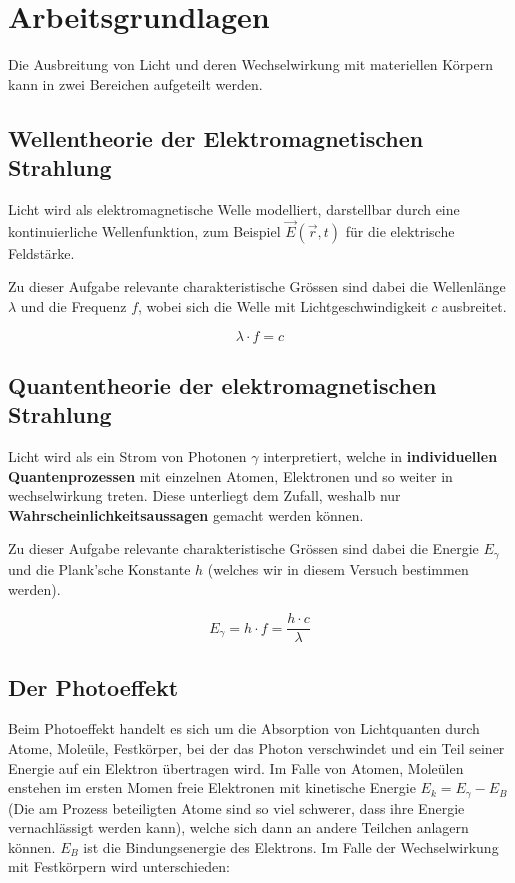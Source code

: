 \section{Arbeitsgrundlagen}

Die Ausbreitung von Licht und deren Wechselwirkung mit  materiellen  K\"orpern
kann in zwei Bereichen aufgeteilt werden.


\subsection{Wellentheorie der Elektromagnetischen Strahlung}

Licht wird als elektromagnetische  Welle  modelliert,  darstellbar  durch eine
kontinuierliche Wellenfunktion,  zum  Beispiel  $\vec{E}(\vec{r},t)$ f\"ur die
elektrische Feldst\"arke.

Zu  dieser  Aufgabe  relevante  charakteristische  Gr\"ossen  sind  dabei  die
Wellenl\"ange  $\lambda$  und  die  Frequenz  $f$, wobei sich  die  Welle  mit
Lichtgeschwindigkeit $c$ ausbreitet.

\begin{equation}
    \lambda \cdot f = c
\end{equation}


\subsection{Quantentheorie der elektromagnetischen Strahlung}

Licht  wird  als  ein  Strom  von  Photonen $\gamma$ interpretiert, welche  in
\textbf{individuellen Quantenprozessen} mit  einzelnen  Atomen, Elektronen und
so weiter  in  wechselwirkung treten. Diese unterliegt dem Zufall, weshalb nur
\textbf{Wahrscheinlichkeitsaussagen} gemacht werden k\"onnen.

Zu dieser Aufgabe relevante charakteristische Gr\"ossen sind dabei die Energie
$E_{\gamma}$ und die Plank'sche Konstante  $h$  (welches wir in diesem Versuch
bestimmen werden).

\begin{equation}
    E_{\gamma} = h \cdot f = \frac{h \cdot c}{\lambda}
\end{equation}


\subsection{Der Photoeffekt}

Beim Photoeffekt  handelt  es  sich  um  die Absorption von Lichtquanten durch
Atome, Mole\"ule, Festk\"orper, bei der  das  Photon verschwindet und ein Teil
seiner  Energie  auf  ein  Elektron  \"ubertragen  wird.  Im Falle von Atomen,
Mole\"ulen  enstehen  im  ersten Momen freie Elektronen mit kinetische Energie
$E_k = E_{\gamma} -  E_B$  (Die  am  Prozess  beteiligten  Atome  sind so viel
schwerer, dass ihre Energie vernachl\"assigt werden kann), welche sich dann an
andere  Teilchen  anlagern   k\"onnen.   $E_B$  ist  die  Bindungsenergie  des
Elektrons.  Im Falle der Wechselwirkung mit Festk\"orpern wird  unterschieden:


